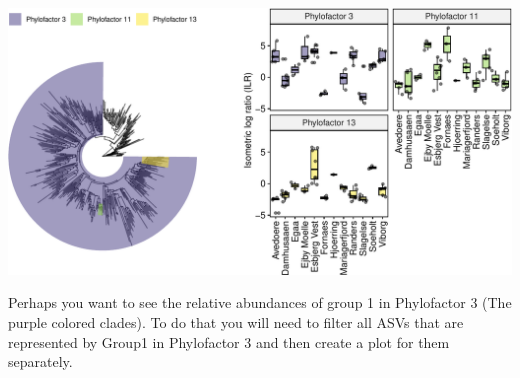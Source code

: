 \documentclass[
]{book}
\begin{document}
\includegraphics{gitbook-demo_files/figure-latex/ILRplotcombined-1.pdf}

Perhaps you want to see the relative abundances of group 1 in Phylofactor 3 (The purple colored clades). To do that you will need to filter all ASVs that are represented by Group1 in Phylofactor 3 and then create a plot for them separately.
\end{document}
